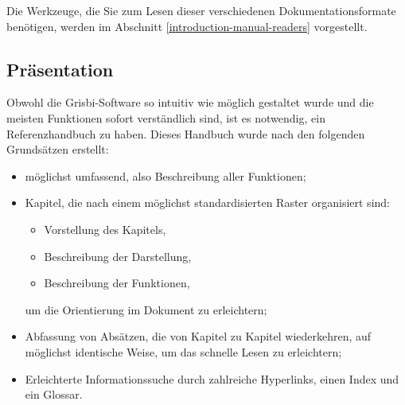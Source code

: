 Die Werkzeuge, die Sie zum Lesen dieser verschiedenen Dokumentationsformate benötigen, werden im Abschnitt \vref{introduction-manual-readers}  vorgestellt.

\subsection{Präsentation\label{introduction-manual-presentation}}

Obwohl die Grisbi-Software so intuitiv wie möglich gestaltet wurde und die meisten Funktionen sofort verständlich sind, ist es notwendig, ein Referenzhandbuch zu haben. Dieses Handbuch wurde nach den folgenden Grundsätzen erstellt:

\begin{itemize} 
	\item möglichst umfassend, also Beschreibung aller Funktionen;%
	\item Kapitel, die nach einem möglichst standardisierten Raster organisiert sind:%
		\begin{itemize}
		\item[\textopenbullet] Vorstellung des Kapitels,%
		\item[\textopenbullet] Beschreibung der Darstellung,%
		\item[\textopenbullet] Beschreibung der Funktionen,%
		\end{itemize}
	um die Orientierung im Dokument zu erleichtern;%
	\item Abfassung von Absätzen, die von Kapitel zu Kapitel wiederkehren, auf möglichst identische Weise, um das schnelle Lesen zu erleichtern;%
	\item Erleichterte Informationssuche durch zahlreiche \gls{Hyperlinks}, einen Index und ein Glossar.%
\end{itemize}

